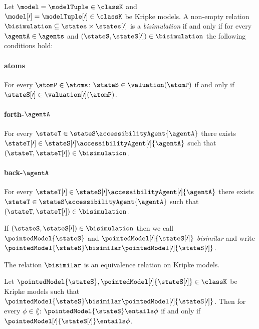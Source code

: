 \documentclass[twoside]{aiml14}
\begin{document}
  \begin{definition}
      Let $\model = \modelTuple \in \classK$ 
      and $\model[\prime] = \modelTuple[\prime] \in \classK$
      be Kripke models. 
      A non-empty relation $\bisimulation \subseteq \states \times \states[\prime]$
      is a {\em bisimulation} if and only if for every $\agentA \in \agents$ 
      and $(\stateS, \stateS[\prime]) \in \bisimulation$ the following conditions hold:

      \paragraph{atoms}
      For every $\atomP \in \atoms$: $\stateS \in \valuation(\atomP)$ if and only if $\stateS[\prime] \in \valuation[\prime](\atomP)$.

      \paragraph{forth-$\agentA$}
      For every $\stateT \in \stateS \accessibilityAgent{\agentA}$ 
      there exists $\stateT[\prime] \in \stateS[\prime] \accessibilityAgent[\prime]{\agentA}$
      such that $(\stateT, \stateT[\prime]) \in \bisimulation$.

      \paragraph{back-$\agentA$}
      For every $\stateT[\prime] \in \stateS[\prime] \accessibilityAgent[\prime]{\agentA}$
      there exists $\stateT \in \stateS \accessibilityAgent{\agentA}$ 
      such that $(\stateT, \stateT[\prime]) \in \bisimulation$.

      If $(\stateS, \stateS[\prime]) \in \bisimulation$ then we call
      $\pointedModel{\stateS}$ and $\pointedModel[\prime]{\stateS[\prime]}$
      {\em bisimilar} and write 
      $\pointedModel{\stateS} \bisimilar \pointedModel[\prime]{\stateS[\prime]}$.
  \end{definition}

  \begin{proposition}
      The relation $\bisimilar$ is an equivalence relation on Kripke models.
  \end{proposition}

  \begin{proposition}
      Let $\pointedModel{\stateS}, \pointedModel[\prime]{\stateS[\prime]} \in \classK$ be Kripke models such that
      $\pointedModel{\stateS} \bisimilar \pointedModel[\prime]{\stateS[\prime]}$. 
      Then for every $\phi \in \lang$:
      $\pointedModel{\stateS} \entails \phi$ if and only if $\pointedModel[\prime]{\stateS[\prime]} \entails \phi$.
  \end{proposition}
\end{document}
